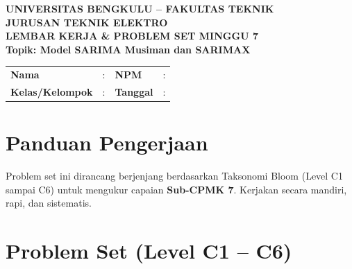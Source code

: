 \documentclass[11pt,a4paper]{article}
\begin{document}
\begin{center}
    {\large \textbf{\color{primaryblue}UNIVERSITAS BENGKULU -- FAKULTAS TEKNIK}}\\[0.1cm]
    {\large \textbf{\color{secondaryblue}JURUSAN TEKNIK ELEKTRO}}\\[0.25cm]
    {\LARGE \textbf{\color{primaryblue}LEMBAR KERJA \& PROBLEM SET MINGGU 7}}\\[0.1cm]
    {\normalsize \textbf{Topik: Model SARIMA Musiman dan SARIMAX}}
\end{center}

\vspace{0.2cm}

\begin{tcolorbox}[colback=boxbg,colframe=primaryblue,arc=2mm,title=\textbf{Identitas Mahasiswa}]
\small
\begin{tabular}{p{2.5cm}p{5.5cm}p{2.5cm}p{4.5cm}}
\textbf{Nama} & : \dotfill & \textbf{NPM} & : \dotfill \\
\textbf{Kelas/Kelompok} & : \dotfill & \textbf{Tanggal} & : \dotfill \\
\end{tabular}
\end{tcolorbox}

\vspace{0.2cm}

\section{Panduan Pengerjaan}
Problem set ini dirancang berjenjang berdasarkan Taksonomi Bloom (Level C1 sampai C6) untuk mengukur capaian \textbf{Sub-CPMK 7}. Kerjakan secara mandiri, rapi, dan sistematis.

\section{Problem Set (Level C1 -- C6)}
\end{document}
